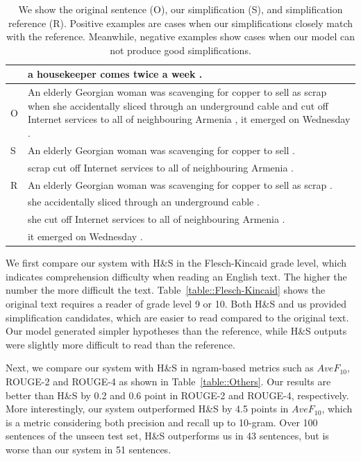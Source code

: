\documentclass[10pt]{article}
\begin{document}
\begin{table}[ht]
\begin{tiny}
\begin{center}
\begin{tabular}{p{2mm}p{149mm}}
        & a housekeeper comes twice a week .\\
\midrule
O       &  An elderly Georgian woman was scavenging for copper to sell as scrap when she accidentally sliced through an underground cable and cut off Internet services to all of neighbouring Armenia , it emerged on Wednesday .\\
S       & An elderly Georgian woman was scavenging for copper to sell .\\
        & scrap cut off Internet services to all of neighbouring Armenia .\\
R       & An elderly Georgian woman was scavenging for copper to sell as scrap .\\
        & she accidentally sliced through an underground cable .\\
        & she cut off Internet services to all of neighbouring Armenia .\\
        & it emerged on Wednesday .\\
        
\bottomrule
\end{tabular} 
\end{center}
\caption{We show the original sentence (O), our simplification (S), and simplification reference (R). Positive examples are cases when our simplifications closely match with the reference. Meanwhile, negative examples show cases when our model can not produce good simplifications.}
\label{table::Examples}
\end{tiny}
\end{table}



We first compare our system with H\&S in the Flesch-Kincaid grade level, which indicates comprehension difficulty when reading an English text.
The higher the number the more difficult the text.
Table~\ref{table::Flesch-Kincaid} shows the original text requires a reader of grade level 9 or 10.
Both H\&S and us provided simplification candidates, which are easier to read compared to the original text.
Our model generated simpler hypotheses than the reference, while H\&S outputs were slightly more difficult to read than the reference.


Next, we compare our system with H\&S in ngram-based metrics such as $AveF_{10}$, ROUGE-2 and ROUGE-4 as shown in Table~\ref{table::Others}.
Our results are better than H\&S by 0.2 and 0.6 point in ROUGE-2 and ROUGE-4, respectively.
More interestingly, our system outperformed H\&S by 4.5 points in $AveF_{10}$, which is a metric considering both precision and recall up to 10-gram.
Over 100 sentences of the unseen test set, H\&S outperforms us in 43 sentences, but is worse than our system in 51 sentences. 
\end{document}
